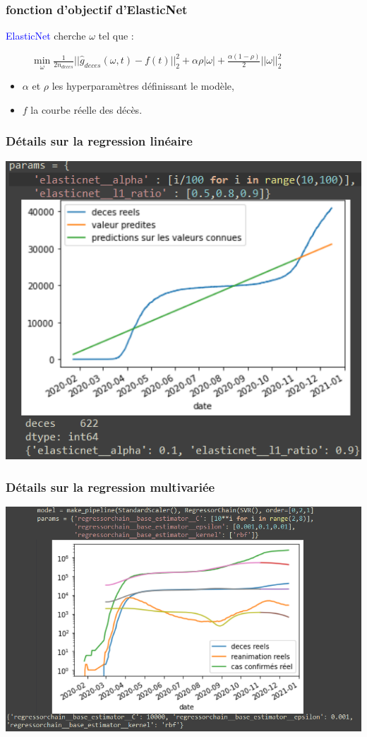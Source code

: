 \documentclass{beamer}[aspectratio = 43]
\begin{document}
\begin{frame}
	\frametitle{fonction d'objectif d'ElasticNet}
	\textcolor{blue}{ElasticNet} cherche $\omega$ tel que :
	\begin{figure}[h]
		$\underset{\omega}{\mathrm{min}} \; \frac{1}{2n_{deces}}||\hat{g}_{deces} (\omega,t) - f(t)||^{2}_{2} + \alpha \rho |\omega| + \frac{\alpha (1-\rho)}{2}||\omega||^{2}_{2}$
		\\
	\end{figure}
	\begin{itemize}
		\item[]$\alpha$ et $\rho$ les hyperparamètres définissant le modèle,\\
		\item[]$f$ la courbe réelle des décès.
	\end{itemize}
\end{frame}

\begin{frame}
	\frametitle{Détails sur la regression linéaire}
	\centering
	\includegraphics[scale=0.6]{EN_old_edit}
\end{frame}

\begin{frame}
	\frametitle{Détails sur la regression multivariée}
	\centering
	\includegraphics[scale=0.6]{Multi_regresseur}
\end{frame}
\end{document}
